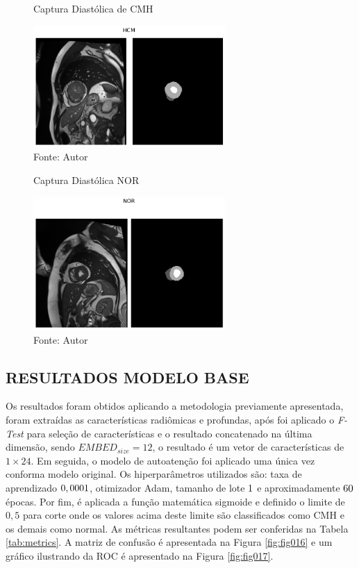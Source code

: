 \begin{figure}[h!]
    \caption{Captura Diastólica de CMH}
    \centering
    \includegraphics[width=0.65\textwidth]{figures/fig019.png}
    \caption*{Fonte: Autor}
    \label{fig:fig019}
\end{figure}

\begin{figure}[h!]
    \centering
    \caption{Captura Diastólica NOR}
    \includegraphics[width=0.65\textwidth]{figures/fig020.png}
    \caption*{Fonte: Autor}
    \label{fig:fig020}
\end{figure}

\subsection{RESULTADOS MODELO BASE}
\label{subsec:resultados_acdc_base}

Os resultados foram obtidos aplicando a metodologia previamente apresentada, foram extraídas as características radiômicas e profundas, após foi aplicado o \textit{F-Test} para seleção de características e o resultado concatenado na última dimensão, sendo $EMBED_{size} = 12$, o resultado é um vetor de características de $1\times24$. Em seguida, o modelo de autoatenção foi aplicado uma única vez conforma modelo original. Os hiperparâmetros utilizados são: taxa de aprendizado $0,0001$, otimizador \gls{Adam}, tamanho de lote $1$ e aproximadamente $60$ épocas. Por fim, é aplicada a função matemática sigmoide e definido o limite de $0,5$ para corte onde os valores acima deste limite são classificados como \gls{CMH} e os demais como normal. As métricas resultantes podem ser conferidas na Tabela \ref{tab:metrics}. A matriz de confusão é apresentada na Figura \ref{fig:fig016} e um gráfico ilustrando da \gls{ROC} é apresentado na Figura \ref{fig:fig017}.
\newline

